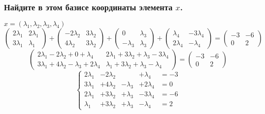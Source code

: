 \documentclass{article}
\begin{document}
\subsubsection*{Найдите в этом базисе координаты элемента $x$.
}
\begin{center}
  $x=(\lambda_1,\lambda_2,\lambda_3,\lambda_4)$
  $$
    \left(\begin{array}{cc}
        2 \lambda_1 & 2 \lambda_1 \\
        3 \lambda_1 & \lambda_1
      \end{array}\right)+\left(\begin{array}{cc}
        -2 \lambda_2 & 3 \lambda_2 \\
        4 \lambda_2  & 3 \lambda_2
      \end{array}\right)+\left(\begin{array}{cc}
        0          & \lambda_3 \\
        -\lambda_3 & \lambda_3
      \end{array}\right)+\left(\begin{array}{cc}
        \lambda_4   & -3 \lambda_4 \\
        2 \lambda_4 & -\lambda_4
      \end{array}\right)=\left(\begin{array}{cc}
        -3 & -6 \\
        0  & 2
      \end{array}\right)
  $$$$
    \left(\begin{array}{cc}
        2 \lambda_1-2 \lambda_2+0+\lambda_4           & 2 \lambda_1+3 \lambda_2+\lambda_3-3 \lambda_4 \\
        3 \lambda_1+4 \lambda_2-\lambda_3+2 \lambda_4 & \lambda_1+3 \lambda_2+\lambda_3-\lambda_4
      \end{array}\right)=\left(\begin{array}{cc}
        -3 & -6 \\
        0  & 2
      \end{array}\right)
  $$$$
    \left\{\begin{array}{ccccccc}
      2 \lambda_1 & - 2\lambda_2 &             & + \lambda_4    & =-3 \\
      3 \lambda_1 & + 4\lambda_2 & - \lambda_3 & +  2 \lambda_4 & =0  \\
      2 \lambda_1 & + 3\lambda_2 & + \lambda_3 & -  3 \lambda_4 & =-6 \\
      \lambda_1   & + 3\lambda_2 & + \lambda_3 & -  \lambda_4   & =2
    \end{array}\right.
$$
\end{center}
\end{document}

